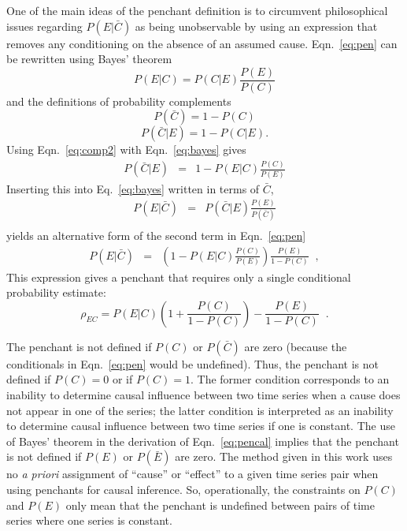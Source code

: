 \documentclass{article}[10pt]
\begin{document}
One of the main ideas of the penchant definition is to circumvent philosophical issues regarding $P(E|\bar{C})$ as being unobservable by using an expression that removes any conditioning on the absence of an assumed cause.  Eqn.\ \ref{eq:pen} can be rewritten using Bayes' theorem 
\begin{equation}
\label{eq:bayes}
P(E|C) = P(C|E)\frac{P(E)}{P(C)}
\end{equation}
and the definitions of probability complements
\begin{equation}
\label{eq:comp1}
P(\bar{C}) = 1-P(C)
\end{equation}
\begin{equation}
\label{eq:comp2}
P(\bar{C}|E) = 1-P(C|E).  
\end{equation}
Using Eqn.\ \ref{eq:comp2} with Eqn.\ \ref{eq:bayes} gives 
\begin{eqnarray*}
P(\bar{C}|E) &=& 1-P(E|C)\frac{P(C)}{P(E)}
\end{eqnarray*}
Inserting this into Eq.\ \ref{eq:bayes} written in terms of $\bar{C}$\;\;,
\begin{eqnarray*}
P(E|\bar{C}) &=& P(\bar{C}|E)\frac{P(E)}{P(\bar{C})}\\
\end{eqnarray*}
yields an alternative form of the second term in Eqn.\ \ref{eq:pen}
\begin{eqnarray*}
P(E|\bar{C}) &=&\left(1-P(E|C)\frac{P(C)}{P(E)}\right)\frac{P(E)}{1-P(C)}\;\;,
\end{eqnarray*}
This expression gives a penchant that requires only a single conditional probability estimate:
\begin{equation}
\label{eq:pencal}
\rho_{EC} = P(E|C)\left(1+\frac{P(C)}{1-P(C)}\right)-\frac{P(E)}{1-P(C)}\;\;.
\end{equation}

The penchant is not defined if $P(C)$ or $P(\bar{C})$ are zero (because the conditionals in Eqn.\ \ref{eq:pen} would be undefined).  Thus, the penchant is not defined if $P(C)=0$ or if $P(C)=1$.  The former condition corresponds to an inability to determine causal influence between two time series when a cause does not appear in one of the series; the latter condition is interpreted as an inability to determine causal influence between two time series if one is constant.  The use of Bayes' theorem in the derivation of Eqn.\ \ref{eq:pencal} implies that the penchant is not defined if $P(E)$ or $P(\bar{E})$ are zero.  The method given in this work uses no {\em a priori} assignment of ``cause'' or ``effect'' to a given time series pair when using penchants for causal inference.  So, operationally, the constraints on $P(C)$ and $P(E)$ only mean that the penchant is undefined between pairs of time series where one series is constant. 
\end{document}

